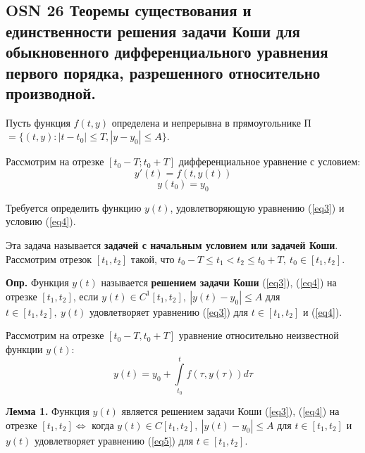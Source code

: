 \subsection*{OSN 26 Теоремы существования и единственности решения задачи Коши для обыкновенного дифференциального уравнения первого порядка, разрешенного относительно производной.}

Пусть функция $f(t,y)$ определена и непрерывна в прямоугольнике 
П$ = \{(t, y) : |t - t_0| \leqslant T, |y - y_0| \leqslant A\}$.

Рассмотрим на отрезке $[t_0 - T ; t_0 + T ]$ дифференциальное уравнение с условием:
\begin{equation}
    y'(t) = f(t, y(t))
    \label{eq3}
\end{equation}
\begin{equation}
    y(t_0) = y_0
    \label{eq4}
\end{equation}

Требуется определить функцию $y(t)$, удовлетворяющую уравнению (\ref{eq3}) и условию (\ref{eq4}).

Эта задача называется \textbf{задачей с начальным условием или задачей Коши}. Рассмотрим отрезок $[t_1, t_2]$ такой, что $t_0 - T \leqslant t_1 < t_2 \leqslant t_0 + T,~t_0 \in [t_1, t_2]$.

\textbf{Опр.} Функция $y(t)$ называется \textbf{решением задачи Коши} (\ref{eq3}), (\ref{eq4}) на отрезке $[t_1, t_2]$, если $y(t) \in C^1[t_1, t_2],~|y(t) - y_0| \leqslant A$ для $t \in [t_1, t_2],~y(t)$ удовлетворяет уравнению (\ref{eq3}) для $t \in [t_1, t_2]$ и (\ref{eq4}).

Рассмотрим на отрезке $[t_0 - T,t_0 + T]$ уравнение относительно неизвестной функции $y(t)$:
\begin{equation}
    y(t) = y_0 + \int\limits_{t_0}^{t}f(\tau, y(\tau))d\tau
    \label{eq5}
\end{equation}

\textbf{Лемма 1.} Функция $y(t)$ является решением задачи Коши (\ref{eq3}), (\ref{eq4}) на отрезке $[t_1, t_2] \iff$ когда $y(t) \in C[t_1, t_2],~|y(t) - y_0| \leqslant A$ для $t \in [t_1, t_2]$ и $y(t)$ удовлетворяет уравнению (\ref{eq5}) для $t \in [t_1, t_2]$.

